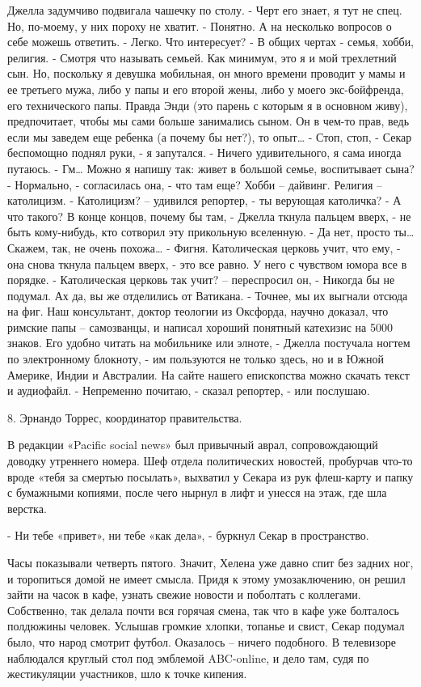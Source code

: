 \documentclass{book}
\begin{document}
Джелла задумчиво подвигала чашечку по столу.
- Черт его знает, я тут не спец. Но, по-моему, у них пороху не хватит.
- Понятно. А на несколько вопросов о себе можешь ответить.
- Легко. Что интересует?
- В общих чертах - семья, хобби, религия.
- Смотря что называть семьей. Как минимум, это я и мой трехлетний сын. Но, поскольку я девушка мобильная, он много времени проводит у мамы и ее третьего мужа, либо у папы и его второй жены, либо у моего экс-бойфренда, его технического папы. Правда Энди (это парень с которым я в основном живу), предпочитает, чтобы мы сами больше занимались сыном. Он в чем-то прав, ведь если мы заведем еще ребенка (а почему бы нет?), то опыт\ldots{}
- Стоп, стоп, - Секар беспомощно поднял руки, - я запутался.
- Ничего удивительного, я сама иногда путаюсь.
- Гм\ldots{} Можно я напишу так: живет в большой семье, воспитывает сына?
- Нормально, - согласилась она, - что там еще? Хобби – дайвинг. Религия – католицизм.
- Католицизм? – удивился репортер, - ты верующая католичка?
- А что такого? В конце концов, почему бы там, - Джелла ткнула пальцем вверх, - не быть кому-нибудь, кто сотворил эту прикольную вселенную.
- Да нет, просто ты\ldots{} Скажем, так, не очень похожа\ldots{}
- Фигня. Католическая церковь учит, что ему, - она снова ткнула пальцем вверх, - это все равно. У него с чувством юмора все в порядке.
- Католическая церковь так учит? – переспросил он, - Никогда бы не подумал. Ах да, вы же отделились от Ватикана.
- Точнее, мы их выгнали отсюда на фиг. Наш консультант, доктор теологии из Оксфорда, научно доказал, что римские папы – самозванцы, и написал хороший понятный катехизис на 5000 знаков. Его удобно читать на мобильнике или элноте, - Джелла постучала ногтем по электронному блокноту, - им пользуются не только здесь, но и в Южной Америке, Индии и Австралии. На сайте нашего епископства можно скачать текст и аудиофайл.
- Непременно почитаю, - сказал репортер, - или послушаю.



8. Эрнандо Торрес, координатор правительства.


В редакции «Pacific social news» был привычный аврал, сопровождающий доводку утреннего номера. Шеф отдела политических новостей, пробурчав что-то вроде «тебя за смертью посылать», выхватил у Секара из рук флеш-карту и папку с бумажными копиями, после чего нырнул в лифт и унесся на этаж, где шла верстка.

- Ни тебе «привет», ни тебе «как дела», - буркнул Секар в пространство.

Часы показывали четверть пятого. Значит, Хелена уже давно спит без задних ног, и торопиться домой не имеет смысла. Придя к этому умозаключению, он решил зайти на часок в кафе, узнать свежие новости и поболтать с коллегами. Собственно, так делала почти вся горячая смена, так что в кафе уже болталось полдюжины человек. Услышав громкие хлопки, топанье и свист, Секар подумал было, что народ смотрит футбол. Оказалось – ничего подобного. В телевизоре наблюдался круглый стол под эмблемой ABC-online, и дело там, судя по жестикуляции участников, шло к точке кипения.
\end{document}
